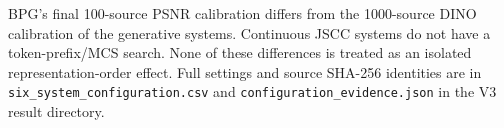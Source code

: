 BPG's final 100-source PSNR calibration differs from the 1000-source DINO calibration of the generative systems. Continuous JSCC systems do not have a token-prefix/MCS search. None of these differences is treated as an isolated representation-order effect. Full settings and source SHA-256 identities are in \texttt{six\_system\_configuration.csv} and \texttt{configuration\_evidence.json} in the V3 result directory.
